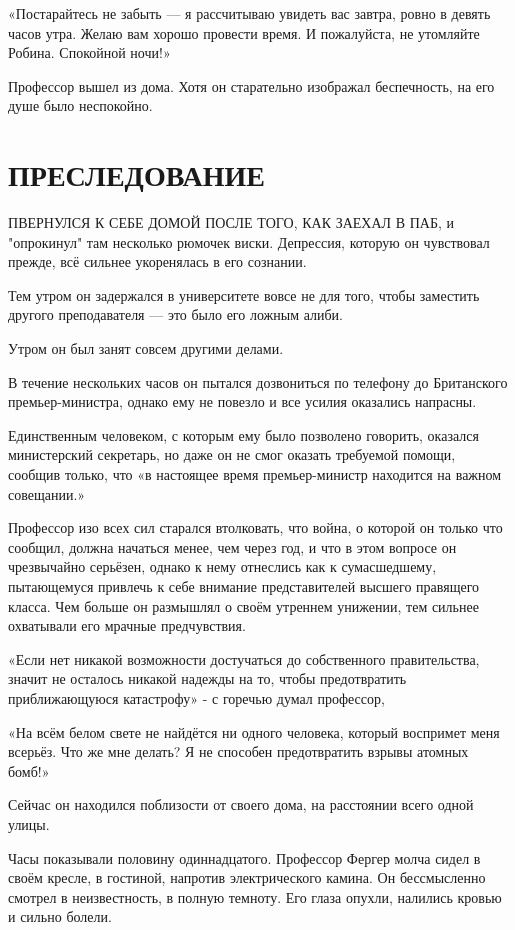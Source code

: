 \documentclass[a5paper, 9pt,
final, openany, twoside=true]{memoir}
\begin{document}
«Постарайтесь не забыть — я рассчитываю увидеть вас завтра, ровно в девять часов утра. Желаю вам хорошо провести время. И пожалуйста, не утомляйте Робина. Спокойной ночи!»

Профессор вышел из дома. Хотя он старательно изображал беспечность, на его душе было неспокойно.
\chapter{ПРЕСЛЕДОВАНИЕ}
П{ ВЕРНУЛСЯ К СЕБЕ ДОМОЙ ПОСЛЕ ТОГО, КАК ЗАЕХАЛ В ПАБ}, и "опрокинул" там несколько рюмочек виски. Депрессия, которую он чувствовал прежде, всё сильнее укоренялась в его сознании.

Тем утром он задержался в университете вовсе не для того, чтобы заместить другого преподавателя — это было его ложным алиби.

Утром он был занят совсем другими делами.

В течение нескольких часов он пытался дозвониться по телефону до Британского премьер-министра, однако ему не повезло и все усилия оказались напрасны.

Единственным человеком, с которым ему было позволено говорить, оказался министерский секретарь, но даже он не смог оказать требуемой помощи, сообщив только, что «в настоящее время премьер-министр находится на важном совещании.»

Профессор изо всех сил старался втолковать, что война, о которой он только что сообщил, должна начаться менее, чем через год, и что в этом вопросе он чрезвычайно серьёзен, однако к нему отнеслись как к сумасшедшему, пытающемуся привлечь к себе внимание представителей высшего правящего класса. Чем больше он размышлял о своём утреннем унижении, тем сильнее охватывали его мрачные предчувствия.

«Если нет никакой возможности достучаться до собственного правительства, значит не осталось никакой надежды на то, чтобы предотвратить приближающуюся катастрофу» - с горечью думал профессор,

«На всём белом свете не найдётся ни одного человека, который воспримет меня всерьёз. Что же мне делать? Я не способен предотвратить взрывы атомных бомб!»

Сейчас он находился поблизости от своего дома, на расстоянии всего одной улицы.\bigskip

Часы показывали половину одиннадцатого. Профессор Фергер молча сидел в своём кресле, в гостиной, напротив электрического камина. Он бессмысленно смотрел в неизвестность, в полную темноту. Его глаза опухли, налились кровью и сильно болели.
\end{document}
